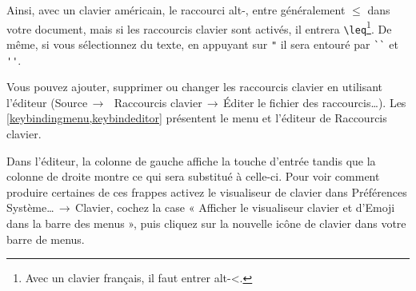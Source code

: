 \documentclass[11pt,french]{article}
\newcommand{\TS}{\textsf{\TeX Shop}}
\newcommand{\cmd}[1]{\textsf{#1}}
\newcommand{\mnu}[1]{\textsf{#1}}
\newcommand{\To}{\,\(\to\)\,}
\begin{document}

Ainsi, avec un clavier américain, le raccourci \cmd{alt-,} entre généralement \texttt{\(\leq\)} dans votre document, mais si les raccourcis clavier sont activés, il entrera \verb|\leq|\footnote{Avec un clavier français, il faut entrer \cmd{alt-<}.}. De même, si vous sélectionnez du texte, en appuyant sur \verb|"| il sera entouré par \verb|``| et \verb|''|. 


Vous pouvez ajouter, supprimer ou changer les raccourcis clavier en utilisant l'éditeur (\mnu{Source}\To\ \mnu{Raccourcis clavier}\To\mnu{Éditer le fichier des raccourcis…}). Les \vref{keybindingmenu,keybindeditor} présentent le menu et l'éditeur de \mnu{Raccourcis clavier}. 

Dans l'éditeur, la colonne de gauche affiche la touche d'entrée tandis que la colonne de droite montre ce qui sera substitué à celle-ci. Pour voir comment produire certaines de ces frappes activez le visualiseur de clavier dans \mnu{Préférences Système…}\To\mnu{Clavier}, cochez la case « \mnu{Afficher le visualiseur clavier et d'Emoji dans la barre des menus} », puis cliquez sur la nouvelle icône de clavier dans votre barre de menus.

\end{document}
